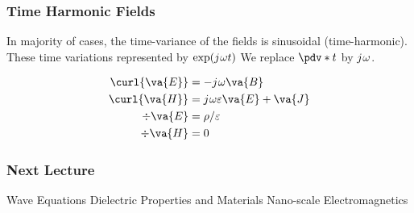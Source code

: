 \documentclass[10pt, compress]{beamer}
\newcommand{\E}{\varepsilon}  %
\newcommand{\p}{\rho}  %
\renewcommand{\j}{{j}\mkern1mu} %
\begin{document}
\begin{frame}
  \frametitle{Time Harmonic Fields}
  \begin{outline}
    \1 In majority of cases, the time-variance of the fields is sinusoidal (time-harmonic).
    \1 These time variations represented by $\exp(\j \omega t)$
    \1 We replace $\pdv*{}{t}$ by $\j \omega$.
  \end{outline}
  \begin{align*}
    \curl{\va{E}} &= -\j \omega \va{B} \\
     \curl{\va{H}} &= \j \omega \E \va{E} + \va{J} \\
     \div{\va{E}} &= \p/\E \\
     \div{\va{H}} &= 0
  \end{align*}
\end{frame}
\begin{frame}
  \frametitle{Next Lecture}
  \begin{outline}
    \1 Wave Equations
    \1 Dielectric Properties and Materials
    \1 Nano-scale Electromagnetics
  \end{outline}
\end{frame}
\end{document}
